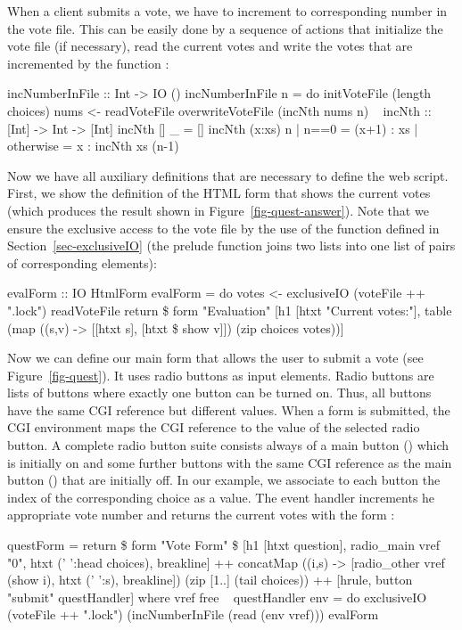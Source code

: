 %
When a client submits a vote, we have to increment to corresponding
number in the vote file. This can be easily done by a sequence of
actions that initialize the vote file (if necessary), read the current
votes and write the votes that are incremented by the function
:
\begin{prog}
incNumberInFile :: Int -> IO ()
incNumberInFile n = do
  initVoteFile (length choices)
  nums <- readVoteFile
  overwriteVoteFile (incNth nums n)
~
incNth :: [Int] -> Int -> [Int]
incNth []     _ = []
incNth (x:xs) n | n==0      = (x+1) : xs
                | otherwise = x : incNth xs (n-1)
\end{prog}
%
Now we have all auxiliary definitions that are necessary to define
the web script. First, we show the definition of
the HTML form  that shows the current votes
(which produces the result shown in Figure~\ref{fig-quest-answer}).
Note that we ensure the exclusive access to the vote file
by the use of the function  defined in
Section~\ref{sec-exclusiveIO}
(the prelude function  joins two lists
into one list of pairs of corresponding elements):
\begin{prog}
evalForm :: IO HtmlForm
evalForm = do
  votes <- exclusiveIO (voteFile ++ ".lock") readVoteFile
  return \$ form "Evaluation"
   [h1 [htxt "Current votes:"],
    table (map ((s,v) -> [[htxt s], [htxt \$ show v]])
               (zip choices votes))]
\end{prog}
%
Now we can define our main form that allows the user to submit a
vote (see Figure~\ref{fig-quest}).
It uses radio buttons as input elements.
\label{radio button}
Radio buttons are lists of buttons where exactly one button
can be turned on. Thus, all buttons have the same CGI reference
but different values. When a form is submitted, the CGI environment
maps the CGI reference to the value of the selected radio button.
A complete radio button suite consists always of a main button
() which is initially on and some further buttons
with the same CGI reference as the main button ()
that are initially off.
In our example, we associate to each button the index of the corresponding
choice as a value. The event handler 
increments he appropriate vote number and returns the current votes
with the form 
:
\begin{prog}
questForm = return \$ form "Vote Form" \$
  [h1 [htxt question],
   radio_main vref "0", htxt (' ':head choices), breakline] ++
  concatMap ((i,s) -> [radio_other vref (show i), htxt (' ':s), breakline])
            (zip [1..] (tail choices)) ++
  [hrule, button "submit" questHandler]
 where
   vref free
~
   questHandler env = do
     exclusiveIO (voteFile ++ ".lock") (incNumberInFile (read (env vref)))
     evalForm
\end{prog}


